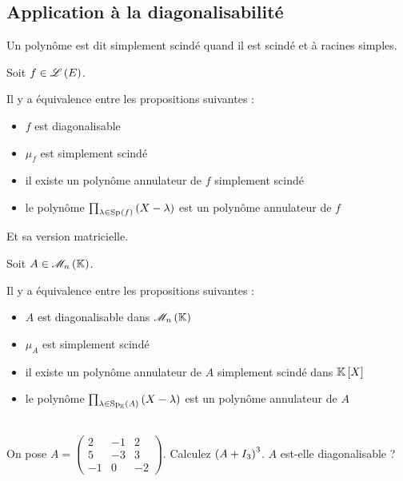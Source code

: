 \subsection{Application à la diagonalisabilité}

\begin{defi}
Un polynôme est dit simplement scindé quand il est scindé et à racines simples.
\end{defi}

\begin{theo}
Soit \(f\in\mathscr{L}\left(E\right)\).

Il y a équivalence entre les propositions suivantes :

\begin{itemize}
    \item \(f\) est diagonalisable \\
    \item \(\mu_f\) est simplement scindé \\
    \item il existe un polynôme annulateur de \(f\) simplement scindé \\
    \item le polynôme \(\prod_{\lambda\in\Sp{f}}\paren{X-\lambda}\) est un polynôme annulateur de \(f\)
\end{itemize}
\end{theo}

Et sa version matricielle.

\begin{theo}
Soit \(A\in\M{n}\).

Il y a équivalence entre les propositions suivantes :

\begin{itemize}
    \item \(A\) est diagonalisable dans \(\M{n}\) \\
    \item \(\mu_A\) est simplement scindé \\
    \item il existe un polynôme annulateur de \(A\) simplement scindé dans \(\poly\) \\
    \item le polynôme \(\prod_{\lambda\in\Sp[\K]{A}}\paren{X-\lambda}\) est un polynôme annulateur de \(A\)
\end{itemize}
\end{theo}

\begin{exo}~\\
On pose \(A=\begin{pmatrix}
2 & -1 & 2 \\
5 & -3 & 3 \\
-1 & 0 & -2
\end{pmatrix}\). Calculez \(\left(A+I_3\right)^3\). \(A\) est-elle diagonalisable ?
\end{exo}

